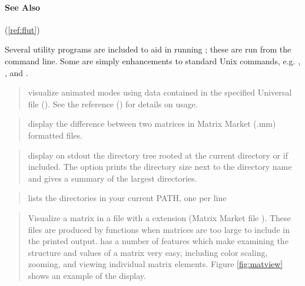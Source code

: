 \paragraph{See Also}
 (\ref{ref:flut})
        
Several utility programs are included to aid in running \flaps;
these are run from the command line. Some are simply enhancements
to standard Unix commands, e.g. , ,
and .
\newline

\begin{quote}
visualize animated modes using data contained in the specified
Universal file (\cite{UniversalFile}).
See the  reference ()
for details on usage.
\end{quote}

\begin{quote}
display the difference between two matrices in Matrix Market (.mm) formatted files.
\end{quote}

\begin{quote}
display on stdout the directory tree rooted at the
current directory or  if included.
The  option prints the directory size
next to the directory name and gives a summary of the
largest directories.
\end{quote}

\begin{quote}
lists the directories in your current PATH, one per line
\end{quote}

\begin{quote}
Visualize a matrix in a file with a  extension
(Matrix Market file \cite{matrixmarket}).
These files are produced by \flaps
functions when matrices are too large to include in the printed output.
 has a number of features which
make examining the structure and values of a matrix very easy,
including color scaling, zooming, and viewing individual matrix
elements. Figure \ref{fig:matview} shows an example of the display.
\end{quote}

